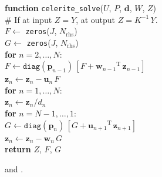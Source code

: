\documentclass[rnaas]{aastex62}
\newcommand{\T}{\ensuremath{\mathrm{T}}}
\newcommand{\bvec}[1]{{\ensuremath{\boldsymbol{#1}}}}
\begin{document}
\medskip
\begin{minipage}{\linewidth}
\textbf{function} \texttt{celerite\_solve}($U$, $P$, $\bvec{d}$, $W$, $Z$) \\
\hspace*{2em}\textsf{\# If at input $Z = Y$, at output $Z = K^{-1}\,Y$.} \\
\hspace*{2em}$F \gets$ \texttt{zeros}($J$, $N_\mathrm{rhs}$) \\
\hspace*{2em}$G \gets$ \texttt{zeros}($J$, $N_\mathrm{rhs}$) \\
\hspace*{2em}\textbf{for} $n = 2,\ldots,N$:\\
\hspace*{2em}\hspace*{2em}$F \gets \texttt{diag}(\bvec{p}_{n-1})\,[F +
    {\bvec{w}_{n-1}}^\T\,\bvec{z}_{n-1}]$\\
\hspace*{2em}\hspace*{2em}$\bvec{z}_n \gets \bvec{z}_n - \bvec{u}_n\,F$\\
\hspace*{2em}\textbf{for} $n = 1,\ldots,N$:\\
\hspace*{2em}\hspace*{2em}$\bvec{z}_n \gets \bvec{z}_n / d_{n}$\\
\hspace*{2em}\textbf{for} $n = N-1,\ldots,1$:\\
\hspace*{2em}\hspace*{2em}$G \gets \texttt{diag}(\bvec{p}_{n})\,[G +
    {\bvec{u}_{n+1}}^\T\,\bvec{z}_{n+1}]$\\
    \hspace*{2em}\hspace*{2em}$\bvec{z}_n \gets \bvec{z}_n - \bvec{w}_n\,G$\\
\hspace*{2em}\textbf{return} $Z$, $F$, $G$
\end{minipage}
\medskip

\citep{Murray:2016} and \citep{Giles:2008}.
\end{document}
